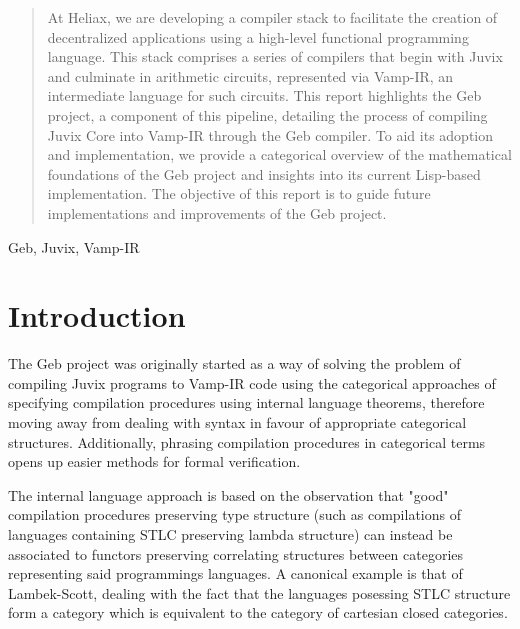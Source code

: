 



\begin{abstract}
At Heliax, we are developing a compiler stack to facilitate the creation
of decentralized applications using a high-level functional programming
language. This stack comprises a series of compilers that begin with
Juvix and culminate in arithmetic circuits, represented via Vamp-IR, an
intermediate language for such circuits. This report highlights the Geb
project, a component of this pipeline, detailing the process of compiling
Juvix Core into Vamp-IR through the Geb compiler. To aid its adoption and
implementation, we provide a categorical overview of the mathematical
foundations of the Geb project and insights into its current Lisp-based
implementation. The objective of this report is to guide future
implementations and improvements of the Geb project.
\end{abstract}


\begin{keywords}
Geb, Juvix, Vamp-IR
\end{keywords}
\maketitle
\section{Introduction}

The Geb project was originally started as a way of solving the problem of compiling Juvix programs to Vamp-IR code using the categorical approaches of specifying compilation procedures using internal language theorems, therefore moving away from dealing with syntax in favour of appropriate categorical structures. Additionally, phrasing compilation procedures in categorical terms opens up easier methods for formal verification.

The internal language approach is based on the observation that "good" compilation procedures preserving type structure (such as compilations of languages containing STLC preserving lambda structure) can instead be associated to functors preserving correlating structures between categories representing said programmings languages. A canonical example is that of Lambek-Scott, dealing with the fact that the languages posessing STLC structure form a category which is equivalent to the category of cartesian closed categories.

